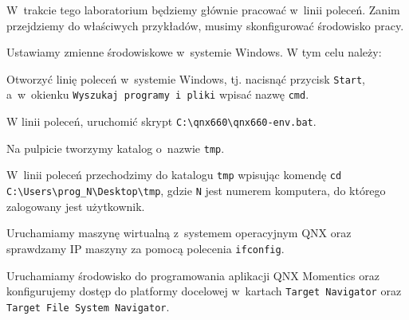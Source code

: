 \begin{example}
W~trakcie tego laboratorium będziemy głównie pracować w~linii poleceń. Zanim przejdziemy do właściwych przykładów, musimy skonfigurować środowisko pracy.

\begin{myenumerate}
\item  Ustawiamy zmienne środowiskowe w~systemie Windows. W tym celu należy:
\begin{myitemize}
\item Otworzyć linię poleceń w~systemie Windows, tj. nacisnąć przycisk \lstinline[style=MyBashStyle]{Start}, a~w~okienku \lstinline[style=MyBashStyle]{Wyszukaj programy i pliki} wpisać nazwę \lstinline[style=MyBashStyle]{cmd}.
\item W linii poleceń, uruchomić skrypt \lstinline[style=MyBashStyle]{C:\qnx660\qnx660-env.bat}.
\end{myitemize}

\item Na pulpicie tworzymy katalog o~nazwie \lstinline[style=MyBashStyle]{tmp}.
\item W~linii poleceń przechodzimy do katalogu \lstinline[style=MyBashStyle]{tmp} wpisując komendę \lstinline[style=MyBashStyle]{cd C:\Users\prog_N\Desktop\tmp}, gdzie \lstinline[style=MyBashStyle]{N} jest numerem komputera, do którego zalogowany jest użytkownik.
\item Uruchamiamy maszynę wirtualną z~systemem operacyjnym QNX oraz sprawdzamy IP maszyny za pomocą polecenia \lstinline[style=MyBashStyle]{ifconfig}.
\item Uruchamiamy środowisko do programowania aplikacji QNX Momentics oraz konfigurujemy dostęp do platformy docelowej w~kartach \lstinline[style=MyBashStyle]{Target Navigator} oraz \lstinline[style=MyBashStyle]{Target File System Navigator}.
\end{myenumerate}
\end{example}

